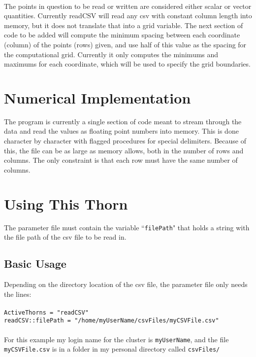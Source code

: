 \paragraph{}
The points in question to be read or written are considered either scalar or vector quantities. Currently readCSV will read any csv with constant column length into memory, but it does not translate that into a grid variable. The next section of code to be added will compute the minimum spacing between each coordinate (column) of the points (rows) given, and use half of this value as the spacing for the computational grid. Currently it only computes the minimums and maximums for each coordinate, which will be used to specify the grid boundaries.

\section{Numerical Implementation}
The program is currently a single section of code meant to stream through the data and read the values as floating point numbers into memory. This is done character by character with flagged procedures for special delimiters. Because of this, the file can be as large as memory allows, both in the number of rows and columns. The only constraint is that each row must have the same number of columns.

\section{Using This Thorn}
The parameter file must contain the variable ``\verb|filePath|" that holds a string with the file path of the csv file to be read in. 


\subsection{Basic Usage}
Depending on the directory location of the csv file, the parameter file only needs the lines:\\
\\
\verb|ActiveThorns = "readCSV"|\\
\verb|readCSV::filePath = "/home/myUserName/csvFiles/myCSVFile.csv"|\\
\\
For this example my login name for the cluster is \verb|myUserName|, and the file \verb|myCSVFile.csv| is in a folder in my personal directory called \verb|csvFiles/|

